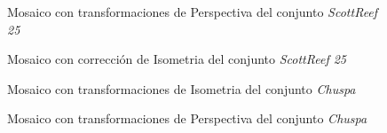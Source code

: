 \begin{figure}[H]
	\centering     %
	
	\hspace{1mm}%
	\hspace{1mm}%
	
	\caption[Mosaico con transformaciones de Perspectiva]{Mosaico con transformaciones de Perspectiva del conjunto \textit{ScottReef 25}}
	\label{imagen:ec:SR_2}
\end{figure}

\begin{figure}[H]
	\centering     %
	\hspace{1mm}%
	\caption[Mosaico con corrección de Isometria]{Mosaico con corrección de Isometria del conjunto \textit{ScottReef 25}}
	\label{imagen:ec:SR_3}
\end{figure}


\begin{figure}[H]
	\centering     %
	\hspace{1mm}%
	\hspace{1mm}%
	\caption[Mosaico con transformaciones de Isometria]{Mosaico con transformaciones de Isometria del conjunto \textit{Chuspa}}
	\label{imagen:ec:0234_1}
\end{figure}

\begin{figure}[H]
	\centering     %
	
	\hspace{1mm}%
	\hspace{1mm}%
	
	\caption[Mosaico con transformaciones de Perspectiva]{Mosaico con transformaciones de Perspectiva del conjunto \textit{Chuspa}}
	\label{imagen:ec:0234_2}
\end{figure}

